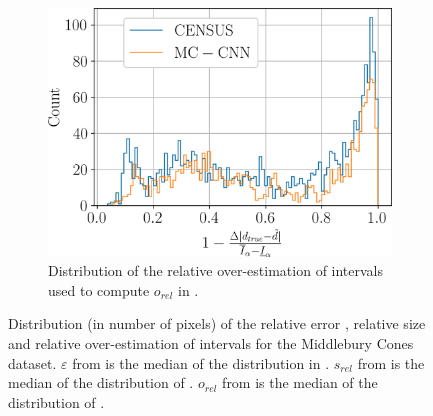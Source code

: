 \begin{figure}
    \begin{subfigure}[t]{\linewidth}
        \centering
        \includegraphics[width=0.5\linewidth]{Images/Chap_5/histogram_o_rel_cones.png}
        \caption{Distribution of the relative over-estimation of intervals used to compute $o_{rel}$ in .}
        \label{fig:distribution_overestimation}
    \end{subfigure}
    \caption{Distribution (in number of pixels) of the relative error , relative size  and relative over-estimation  of intervals for the Middlebury Cones dataset. $\varepsilon$ from  is the median of the distribution in . $s_{rel}$ from  is the median of the distribution of . $o_{rel}$ from  is the median of the distribution of .}
    \label{eq:distribution_metrics_cones}
\end{figure}


